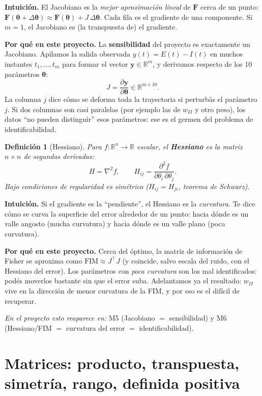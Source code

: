 \documentclass[11pt,a4paper]{article}
\newtheorem{definition}{Definición}
\newcommand{\R}{\mathbb{R}}
\newcommand{\thetavec}{\bm{\theta}}
\newcommand{\transp}{^{\top}}
\begin{document}
\textbf{Intuición.} El Jacobiano es la \emph{mejor aproximación lineal} de $\mathbf{F}$ cerca de un punto: $\mathbf{F}(\thetavec+\Delta\thetavec)\approx \mathbf{F}(\thetavec)+J\,\Delta\thetavec$. Cada fila es el gradiente de una componente. Si $m=1$, el Jacobiano es (la transpuesta de) el gradiente.

\textbf{Por qué en este proyecto.} La \textbf{sensibilidad} del proyecto es exactamente un Jacobiano. Apilamos la salida observada $y(t)=E(t)-I(t)$ en muchos instantes $t_1,\dots,t_m$ para formar el vector $\mathbf{y}\in\R^m$, y derivamos respecto de los 10 parámetros $\thetavec$:
\[
J=\frac{\partial\mathbf{y}}{\partial\thetavec}\in\R^{m\times 10}.
\]
La columna $j$ dice cómo se deforma toda la trayectoria si perturbás el parámetro $j$. Si dos columnas son casi paralelas (por ejemplo las de $w_{II}$ y otro peso), los datos ``no pueden distinguir'' esos parámetros: ese es el germen del problema de identificabilidad.

\begin{definition}[Hessiano]
Para $f:\R^n\to\R$ escalar, el \textbf{Hessiano} es la matriz $n\times n$ de segundas derivadas:
\[
H=\nabla^2 f,\qquad H_{ij}=\frac{\partial^2 f}{\partial\theta_i\,\partial\theta_j}.
\]
Bajo condiciones de regularidad es \emph{simétrico} ($H_{ij}=H_{ji}$, teorema de Schwarz).
\end{definition}

\textbf{Intuición.} Si el gradiente es la ``pendiente'', el Hessiano es la \emph{curvatura}. Te dice cómo se curva la superficie del error alrededor de un punto: hacia dónde es un valle angosto (mucha curvatura) y hacia dónde es un valle plano (poca curvatura).

\textbf{Por qué en este proyecto.} Cerca del óptimo, la matriz de información de Fisher se aproxima como $\mathrm{FIM}\approx J\transp J$ (y coincide, salvo escala del ruido, con el Hessiano del error). Los parámetros con \emph{poca curvatura} son los mal identificados: podés moverlos bastante sin que el error suba. Adelantamos ya el resultado: $w_{II}$ vive en la dirección de menor curvatura de la FIM, y por eso es el difícil de recuperar.

\emph{En el proyecto esto reaparece en:} M5 (Jacobiano $=$ sensibilidad) y M6 (Hessiano/FIM $=$ curvatura del error $=$ identificabilidad).

\section{Matrices: producto, transpuesta, simetría, rango, definida positiva}
\end{document}
